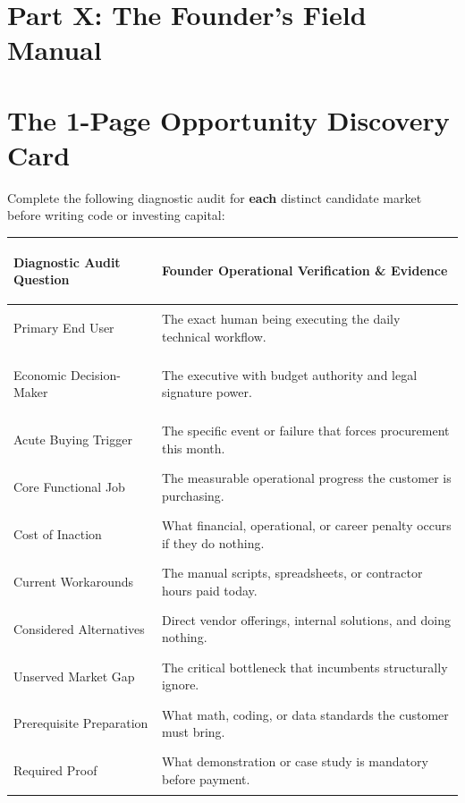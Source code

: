 \section*{Part X: The Founder's Field Manual}

\section{The 1-Page Opportunity Discovery Card}

Complete the following diagnostic audit for \textbf{each} distinct candidate market before writing code or investing capital:

\begin{tcolorbox}[
  enhanced,
  colback=BayesSurface!60,
  colframe=BayesBorder,
  boxrule=0.5pt,
  arc=3pt,
  left=3pt,right=3pt,top=3pt,bottom=3pt,
  boxsep=1pt
]
\scriptsize
\begin{tabularx}{\linewidth}{>{\bfseries\raggedright\arraybackslash}p{2.3cm} X}
\toprule
\textbf{Diagnostic Audit Question} & \textbf{Founder Operational Verification \& Evidence} \\
\midrule
Primary End User & The exact human being executing the daily technical workflow. \\
\addlinespace[2pt]
Economic Decision-Maker & The executive with budget authority and legal signature power. \\
\addlinespace[2pt]
Acute Buying Trigger & The specific event or failure that forces procurement this month. \\
\addlinespace[2pt]
Core Functional Job & The measurable operational progress the customer is purchasing. \\
\addlinespace[2pt]
Cost of Inaction & What financial, operational, or career penalty occurs if they do nothing. \\
\addlinespace[2pt]
Current Workarounds & The manual scripts, spreadsheets, or contractor hours paid today. \\
\addlinespace[2pt]
Considered Alternatives & Direct vendor offerings, internal solutions, and doing nothing. \\
\addlinespace[2pt]
Unserved Market Gap & The critical bottleneck that incumbents structurally ignore. \\
\addlinespace[2pt]
Prerequisite Preparation & What math, coding, or data standards the customer must bring. \\
\addlinespace[2pt]
Required Proof & What demonstration or case study is mandatory before payment. \\

\end{tabularx}
\end{tcolorbox}
